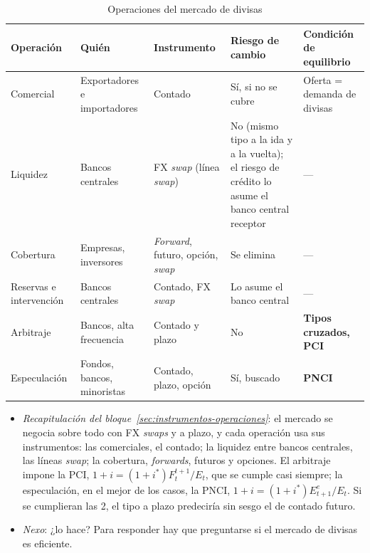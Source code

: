 \documentclass[11pt]{article}
\begin{document}
\begin{table}[H]
\centering
\caption{Operaciones del mercado de divisas}\label{tab:operaciones}
\small
\begin{tabular}{>{\centering\arraybackslash}m{2.4cm}>{\centering\arraybackslash}m{3.0cm}>{\centering\arraybackslash}m{3.0cm}>{\centering\arraybackslash}m{2.4cm}>{\centering\arraybackslash}m{2.8cm}}
\toprule
\rowcolor{tceeazulpalido}\textbf{Operación} & \textbf{Quién} & \textbf{Instrumento} & \textbf{Riesgo de cambio} & \textbf{Condición de equilibrio}\\
\midrule
Comercial & Exportadores e importadores & Contado & Sí, si no se cubre & Oferta = demanda de divisas\\
\addlinespace[0.2em]
Liquidez & Bancos centrales & FX \emph{swap} (línea \emph{swap}) & No (mismo tipo a la ida y a la vuelta); el riesgo de crédito lo asume el banco central receptor & —\\
\addlinespace[0.2em]
Cobertura & Empresas, inversores & \emph{Forward}, futuro, opción, \emph{swap} & Se elimina & —\\
\addlinespace[0.2em]
Reservas e intervención & Bancos centrales & Contado, FX \emph{swap} & Lo asume el banco central & —\\
\addlinespace[0.2em]
\rowcolor{tceesalvia}Arbitraje & Bancos, alta frecuencia & Contado y plazo & \textcolor{tceeverde}{No} & \textbf{Tipos cruzados, PCI}\\
\addlinespace[0.2em]
\rowcolor{tceesalvia}Especulación & Fondos, bancos, minoristas & Contado, plazo, opción & \textcolor{tceerojo}{Sí, buscado} & \textbf{PNCI}\\
\bottomrule
\end{tabular}
\end{table}

\begin{itemize}
\item \emph{Recapitulación del bloque~\ref{sec:instrumentos-operaciones}}: el mercado se negocia sobre todo con FX \emph{swaps} y a plazo, y cada operación usa sus instrumentos: las comerciales, el contado; la liquidez entre bancos centrales, las líneas \emph{swap}; la cobertura, \emph{forwards}, futuros y opciones. El arbitraje impone la PCI, $1+i=(1+i^{*})F_t^{t+1}/E_t$, que se cumple casi siempre; la especulación, en el mejor de los casos, la PNCI, $1+i=(1+i^{*})E^e_{t+1}/E_t$. Si se cumplieran las 2, el tipo a plazo predeciría sin sesgo el de contado futuro.
\item \emph{Nexo}: ¿lo hace? Para responder hay que preguntarse si el mercado de divisas es eficiente.
\end{itemize}
\end{document}
